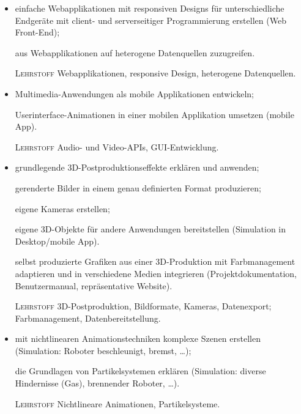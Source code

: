 \begin{itemize}[label={-}]
    \item einfache Webapplikationen mit responsiven Designs für unterschiedliche Endgeräte mit client- und serverseitiger Programmierung erstellen
        {\color{red}(Web Front-End)};
    \item[] aus Webapplikationen auf heterogene Datenquellen zuzugreifen.
    \item[\tiny\textsc{Lehrstoff}] Webapplikationen, responsive Design, heterogene Datenquellen.\lehrstoffrule
  
    \item Multimedia-Anwendungen als mobile Applikationen entwickeln;
    \item[] Userinterface-Animationen in einer mobilen Applikation umsetzen
        {\color{red}(mobile App)}.
    \item[\tiny\textsc{Lehrstoff}] Audio- und Video-APIs, GUI-Entwicklung.
\end{itemize}

\begin{itemize}[label={-}]
    \item grundlegende 3D-Postproduktionseffekte erklären und anwenden;
    \item[] gerenderte Bilder in einem genau definierten Format produzieren;
    \item[] eigene Kameras erstellen;
    \item[] eigene 3D-Objekte für andere Anwendungen bereitstellen
        {\color{red}(Simulation in Desktop/mobile App)}.
    \item[] selbst produzierte Grafiken aus einer 3D-Produktion mit Farbmanagement adaptieren und in verschiedene Medien integrieren
        {\color{red}(Projektdokumentation, Benutzermanual, repräsentative Website)}.
    \item[\tiny\textsc{Lehrstoff}] 3D-Postproduktion, Bildformate, Kameras, Datenexport; Farbmanagement, Datenbereitstellung.\lehrstoffrule

    \item mit nichtlinearen Animationstechniken komplexe Szenen erstellen
        {\color{red}(Simulation: Roboter beschleunigt, bremst, \dots)};
    \item[] die Grundlagen von Partikelsystemen erklären
        {\color{red}(Simulation: diverse Hindernisse (Gas), brennender Roboter, \dots)}.
    \item[\tiny\textsc{Lehrstoff}] Nichtlineare Animationen, Partikelsysteme.
\end{itemize}

